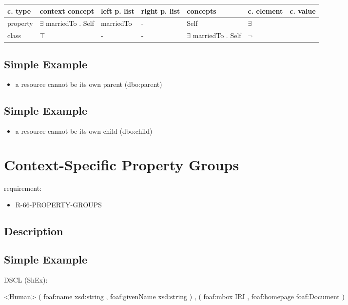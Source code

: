 \documentclass{llncs}
\newenvironment{gcotable}{
  \scriptsize
  \sffamily
  \vspace{0.3cm}
  \begin{tabular}{l|l|l|l|l|l|l}
  \hline
  \textbf{c. type} & \textbf{context concept} & \textbf{left p. list} & \textbf{right p. list} & \textbf{concepts} & \textbf{c. element} & \textbf{c. value} \\
  \hline

}{
  \hline
  \end{tabular}
  \linebreak
}
\begin{document}
\begin{gcotable}
property & $\exists$ marriedTo . Self & marriedTo & - & Self & $\exists$ \\
class & $\top$ & - & - & $\exists$ marriedTo . Self & $\neg$ \\
\end{gcotable}

\subsection{Simple Example}

\begin{itemize}
	\item a resource cannot be its own parent (dbo:parent)
\end{itemize}

\subsection{Simple Example}

\begin{itemize}
	\item a resource cannot be its own child (dbo:child)
\end{itemize}

\section{Context-Specific Property Groups}

requirement:

\begin{itemize}
	\item R-66-PROPERTY-GROUPS
\end{itemize}

\subsection{Description}

\subsection{Simple Example}

DSCL (ShEx):
\begin{ex}
<Human> { 
    (  
        foaf:name xsd:string ,
        foaf:givenName xsd:string 
    ) ,
    (
        foaf:mbox IRI ,
        foaf:homepage foaf:Document
    ) }
\end{ex}
\end{document}
